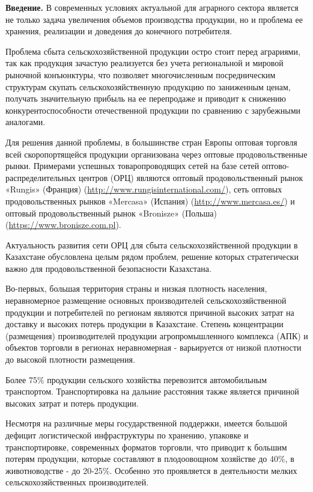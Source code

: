 \begin{multicols}{2}
{\bfseries Введение.} В современных условиях актуальной для аграрного
сектора является не только задача увеличения объемов производства
продукции, но и проблема ее хранения, реализации и доведения до
конечного потребителя.

Проблема сбыта сельскохозяйственной продукции остро стоит перед
аграриями, так как продукция зачастую реализуется без учета региональной
и мировой рыночной конъюнктуры, что позволяет многочисленным
посредническим структурам скупать сельскохозяйственную продукцию по
заниженным ценам, получать значительную прибыль на ее перепродаже и
приводит к снижению конкурентоспособности отечественной продукции по
сравнению с зарубежными аналогами.

Для решения данной проблемы, в большинстве стран Европы оптовая торговля
всей скоропортящейся продукции организована через оптовые
продовольственные рынки. Примерами успешных товаропроводящих сетей на
базе сетей оптово-распределительных центров (ОРЦ) являются оптовый
продовольственный рынок «Rungis» (Франция)
(\url{http://www.rungisinternational.com/}), сеть
оптовых продовольственных рынков «Mercasa» (Испания)
(\url{http://www.mercasa.es/}) и оптовый продовольственный
рынок «Bronisze» (Польша)
(\href{https://www.bronisze.com.pl/ru}{https://www.bronisze.com.pl}).

Актуальность развития сети ОРЦ для сбыта сельскохозяйственной продукции
в Казахстане обусловлена целым рядом проблем, решение которых
стратегически важно для продовольственной безопасности Казахстана.

Во-первых, большая территория страны и низкая плотность населения,
неравномерное размещение основных производителей сельскохозяйственной
продукции и потребителей по регионам являются причиной высоких затрат на
доставку и высоких потерь продукции в Казахстане. Степень концентрации
(размещения) производителей продукции агропромышленного комплекса (АПК)
и объектов торговли в регионах неравномерная - варьируется от низкой
плотности до высокой плотности размещения.

Более 75\% продукции сельского хозяйства перевозится автомобильным
транспортом. Транспортировка на дальние расстояния также является
причиной высоких затрат и потерь продукции.

Несмотря на различные меры государственной поддержки, имеется большой
дефицит логистической инфраструктуры по хранению, упаковке и
транспортировке, современных форматов торговли, что приводит к большим
потерям продукции, которые составляют в плодоовощном хозяйстве до 40\%,
в животноводстве - до 20-25\%. Особенно это проявляется в деятельности
мелких сельскохозяйственных производителей.


\end{multicols}
